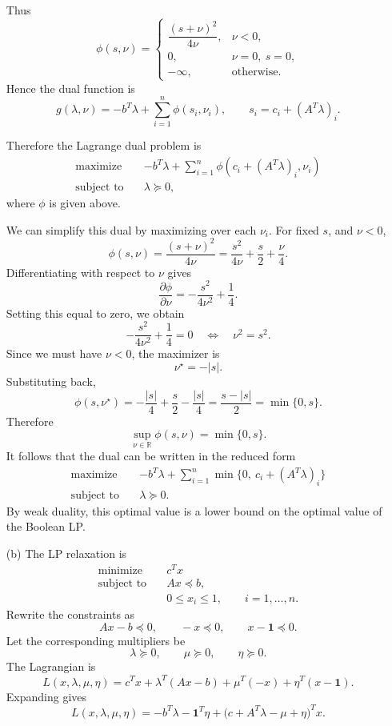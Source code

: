 \documentclass[11pt,letter,notitlepage]{article}
\theoremstyle{definition}
\begin{document}
\begin{solution}
\begin{enumerate}
    Thus
    \[
    \phi(s,\nu)=
    \begin{cases}
        \dfrac{(s+\nu)^2}{4\nu}, & \nu<0,\\[6pt]
        0, & \nu=0,\ s=0,\\[4pt]
        -\infty, & \text{otherwise}.
    \end{cases}
    \]
    Hence the dual function is
    \[
    g(\lambda,\nu)
    =
    -b^T\lambda+\sum_{i=1}^n \phi(s_i,\nu_i),
    \qquad
    s_i=c_i+(A^T\lambda)_i.
    \]

    Therefore the Lagrange dual problem is
    \[
    \begin{aligned}
        \text{maximize}\quad &
        -b^T\lambda+\sum_{i=1}^n \phi\!\left(c_i+(A^T\lambda)_i,\nu_i\right)\\
        \text{subject to}\quad & \lambda\succeq 0,
    \end{aligned}
    \]
    where $\phi$ is given above.

    We can simplify this dual by maximizing over each $\nu_i$. For fixed
    $s$, and $\nu<0$,
    \[
    \phi(s,\nu)=\frac{(s+\nu)^2}{4\nu}
    =\frac{s^2}{4\nu}+\frac{s}{2}+\frac{\nu}{4}.
    \]
    Differentiating with respect to $\nu$ gives
    \[
    \frac{\partial \phi}{\partial \nu}
    =
    -\frac{s^2}{4\nu^2}+\frac14.
    \]
    Setting this equal to zero, we obtain
    \[
    -\frac{s^2}{4\nu^2}+\frac14=0
    \quad\Longleftrightarrow\quad
    \nu^2=s^2.
    \]
    Since we must have $\nu<0$, the maximizer is
    \[
    \nu^\star=-|s|.
    \]
    Substituting back,
    \[
    \phi(s,\nu^\star)
    =
    -\frac{|s|}{4}+\frac{s}{2}-\frac{|s|}{4}
    =
    \frac{s-|s|}{2}
    =
    \min\{0,s\}.
    \]
    Therefore
    \[
    \sup_{\nu\in\mathbb{R}} \phi(s,\nu)=\min\{0,s\}.
    \]
    It follows that the dual can be written in the reduced form
    \[
    \boxed{
    \begin{aligned}
        \text{maximize}\quad &
        -b^T\lambda+\sum_{i=1}^n \min\bigl\{0,\ c_i+(A^T\lambda)_i\bigr\}\\
        \text{subject to}\quad & \lambda\succeq 0.
    \end{aligned}}
    \]
    By weak duality, this optimal value is a lower bound on the optimal
    value of the Boolean LP.

    \item[(b)] The LP relaxation is
    \[
    \begin{aligned}
        \text{minimize}\quad & c^T x\\
        \text{subject to}\quad & Ax\preceq b,\\
        & 0\le x_i\le 1,\qquad i=1,\dots,n.
    \end{aligned}
    \tag{5.107}
    \]
    Rewrite the constraints as
    \[
    Ax-b\preceq 0,\qquad -x\preceq 0,\qquad x-\mathbf 1\preceq 0.
    \]
    Let the corresponding multipliers be
    \[
    \lambda\succeq 0,\qquad \mu\succeq 0,\qquad \eta\succeq 0.
    \]
    The Lagrangian is
    \[
    L(x,\lambda,\mu,\eta)
    =
    c^T x+\lambda^T(Ax-b)+\mu^T(-x)+\eta^T(x-\mathbf 1).
    \]
    Expanding gives
    \[
    L(x,\lambda,\mu,\eta)
    =
    -b^T\lambda-\mathbf 1^T\eta
    +\bigl(c+A^T\lambda-\mu+\eta\bigr)^T x.
    \]


\end{enumerate}
\end{solution}
\end{document}
